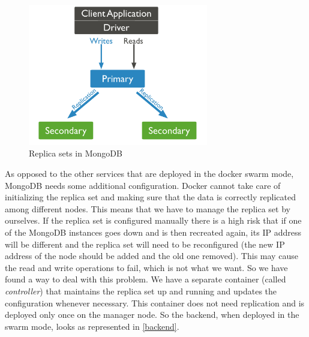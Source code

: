     \begin{figure}[H]
		\centering
		\includegraphics[width=0.7\textwidth]{images/replication.png}
		\caption{Replica sets in MongoDB}
		\label{repl}
	\end{figure}


As opposed to the other services that are deployed in the docker swarm mode, MongoDB needs some additional configuration. Docker cannot take care of initializing the replica set and making sure that the data is correctly replicated among different nodes. This means that we have to manage the replica set by ourselves. If the replica set is configured manually there is a high risk that if one of the MongoDB instances goes down and is then recreated again, its IP address will be different and the replica set will need to be reconfigured (the new IP address of the node should be added and the old one removed). This may cause the read and write operations to fail, which is not what we want. So we have found a way to deal with this problem. We have a separate container (called \textit{controller}) that maintains the replica set up and running and updates the configuration whenever necessary.  This container does not need replication and is deployed only once on the manager node. So the backend, when deployed in the swarm mode, looks as represented in \autoref{backend}.

